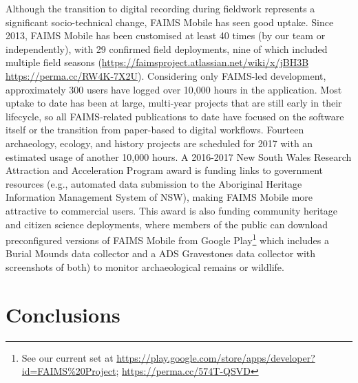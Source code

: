 \documentclass[preprint,12pt, a4paper]{elsarticle}
\begin{document}
Although the transition to digital recording during fieldwork represents a significant socio-technical change, FAIMS Mobile has seen good uptake. Since 2013, FAIMS Mobile has been customised at least 40 times (by our team or independently), with 29 confirmed field deployments, nine of which included multiple field seasons (\url{https://faimsproject.atlassian.net/wiki/x/jBH3B} \url{https://perma.cc/RW4K-7X2U}). Considering only FAIMS-led development, approximately 300 users have logged over 10,000 hours in the application. Most uptake to date has been at large, multi-year projects that are still early in their lifecycle, so all FAIMS-related publications to date have focused on the software itself or the transition from paper-based to digital workflows. Fourteen archaeology, ecology, and history projects are scheduled for 2017 with an estimated usage of another 10,000 hours. A 2016-2017 New South Wales Research Attraction and Acceleration Program award is funding links to government resources (e.g., automated data submission to the Aboriginal Heritage Information Management System of NSW), making FAIMS Mobile more attractive to commercial users. This award is also funding community heritage and citizen science deployments, where members of the public can download preconfigured versions of FAIMS Mobile from Google Play\footnote{See our current set at \url{https://play.google.com/store/apps/developer?id=FAIMS\%20Project}; \url{https://perma.cc/574T-QSVD} } which includes a Burial Mounds data collector and a ADS Gravestones data collector with screenshots of both) to monitor archaeological remains or wildlife.


\section{Conclusions}
\end{document}
